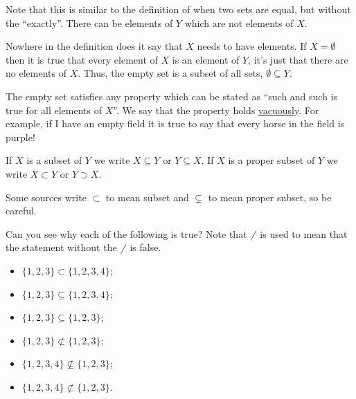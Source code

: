 \documentclass[fleqn]{LectureClass/LectureClass}
\begin{document}
    Note that this is similar to the definition of when two sets are equal, but without the \enquote{exactly}.
    There can be elements of \(Y\) which are not elements of \(X\).
    
    Nowhere in the definition does it say that \(X\) needs to have elements.
    If \(X = \emptyset\) then it is true that every element of \(X\) is an element of \(Y\), it's just that there are no elements of \(X\).
    Thus, the empty set is a subset of all sets, \(\emptyset \subseteq Y\).
    
    \begin{remark}{}{}
        The empty set satisfies any property which can be stated as \enquote{such and such is true for all elements of \(X\)}.
        We say that the property holds \href{https://en.wikipedia.org/wiki/Vacuous_truth}{vacuously}.
        For example, if I have an empty field it is true to say that every horse in the field is purple!
    \end{remark}
    
    \begin{ntn}{}{}
        If \(X\) is a subset of \(Y\) we write \(X \subseteq Y\) or \(Y \subseteq X\).
        If \(X\) is a proper subset of \(Y\) we write \(X \subset Y\) or \(Y \supset X\).
        
        \begin{wrn}
            Some sources write \(\subset\) to mean subset and \(\subsetneq\) to mean proper subset, so be careful.
        \end{wrn}
    \end{ntn}
    
    \begin{exm}{}{}
        Can you see why each of the following is true?
        Note that \(\cancel{\phantom{x}}\) is used to mean that the statement without the \(\cancel{\phantom{x}}\) is false.
        \begin{itemize}
            \item \(\{1, 2, 3\} \subset \{1, 2, 3, 4\}\);
            \item \(\{1, 2, 3\} \subseteq \{1, 2, 3, 4\}\);
            \item \(\{1, 2, 3\} \subseteq \{1, 2, 3\}\);
            \item \(\{1, 2, 3\} \not\subset \{1, 2, 3\}\);
            \item \(\{1, 2, 3, 4\} \not\subseteq \{1, 2, 3\}\);
            \item \(\{1, 2, 3, 4\} \not\subset \{1, 2, 3\}\).
        \end{itemize}
    \end{exm}
    
\end{document}
